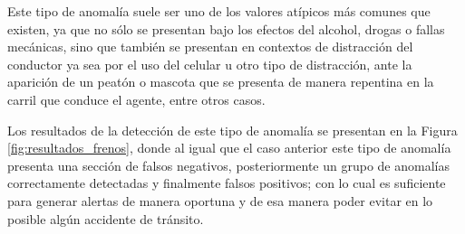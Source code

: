 Este tipo de anomal\'{i}a suele ser uno de los valores at\'{i}picos m\'{a}s comunes que existen, ya que no s\'{o}lo se presentan bajo los efectos del alcohol, drogas o fallas mec\'{a}nicas, sino que tambi\'{e}n se presentan en contextos de distracci\'{o}n del conductor ya sea por el uso del celular u otro tipo de distracci\'{o}n, ante la aparici\'{o}n de un peat\'{o}n o mascota que se presenta de manera repentina en la carril que conduce el agente, entre otros casos.

\vspace{5mm} %

Los resultados de la detecci\'{o}n de este tipo de anomal\'{i}a se presentan en la Figura \ref{fig:resultados_frenos}, donde al igual que el caso anterior este tipo de anomal\'{i}a presenta una secci\'{o}n de falsos negativos, posteriormente un grupo de anomal\'{i}as correctamente detectadas y finalmente falsos positivos; con lo cual es suficiente para generar alertas de manera oportuna y de esa manera poder evitar en lo posible alg\'{u}n accidente de tr\'{a}nsito.

